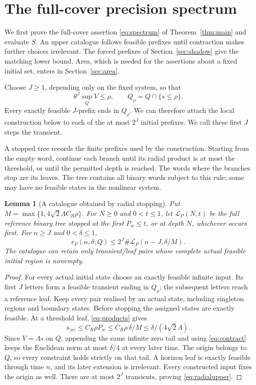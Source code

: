 \documentclass[11pt]{amsart}
\newtheorem{lemma}[theorem]{Lemma}
\theoremstyle{definition}
\theoremstyle{remark}
\numberwithin{equation}{section}
\begin{document}
\section{The full-cover precision spectrum}\label{sec:rates}
We first prove the full-cover assertion \eqref{eq:spectrum} of
Theorem~\ref{thm:main} and evaluate $S$. An upper catalogue
follows feasible prefixes until contraction makes further choices
irrelevant. The forced prefixes of Section~\ref{sec:shadow} give
the matching lower bound. Area, which is needed for the assertions
about a fixed initial set, enters in Section~\ref{sec:area}.

Choose $J\ge1$, depending only on the fixed system, so that
\begin{equation}\label{eq:localentry}
\theta^J\sup_Q V\le\rho,
\qquad Q_\rho=Q\cap\{s\le\rho\}.
\end{equation}
Every exactly feasible $J$-prefix ends in $Q_\rho$. We can therefore
attach the local construction below to each of the at most $2^J$
initial prefixes. We call these first $J$ steps the transient.

A stopped tree records the finite prefixes used by the construction.
Starting from the empty word, continue each branch until its radial
product is at most the threshold, or until the permitted depth is
reached. The words where the branches stop are its leaves. The tree
contains all binary words subject to this rule; some may have no
feasible states in the nonlinear system.

\begin{lemma}[A catalogue obtained by radial stopping]\label{lem:stopping}
Put $M=\max\{1,4\sqrt2\Lambda C_R\rho\}$.
For $N\ge0$ and $0<t\le1$, let $\mathcal L_P(N,t)$ be the full
reference binary tree stopped at the first $P_w\le t$, or at
depth $N$, whichever occurs first. For $n\ge J$ and $0<\delta\le1$,
\begin{equation}\label{eq:radialupper}
r_F(n,\delta;Q)\le 2^J\#\mathcal L_P(n-J,\delta/M).
\end{equation}
The catalogue can retain only transient/leaf pairs whose complete
actual feasible initial region is nonempty.
\end{lemma}
\begin{proof}
For every actual initial state choose an exactly feasible infinite
input. Its first $J$ letters form a feasible transient ending in
$Q_\rho$; the subsequent letters reach a reference leaf.
Keep every pair realised by an actual state, including singleton
regions and boundary states. Before stopping the assigned states
are exactly feasible. At a threshold leaf, \eqref{eq:products} gives
\[
s_{|w|}\le C_R\rho P_w\le C_R\rho\,\delta/M
                         \le\delta/(4\sqrt2\Lambda).
\]
Since $V=\Lambda s$ on $Q$, appending the same infinite zero tail
and using \eqref{eq:contract} keeps the Euclidean norm at most
$\delta/4$ at every later time. The origin belongs to $Q$,
so every constraint holds strictly on that tail. A horizon leaf
is exactly feasible through time $n$, and its later extension is
irrelevant. Every constructed input fixes the origin as well.
There are at most $2^J$ transients, proving \eqref{eq:radialupper}.
\end{proof}
\end{document}
